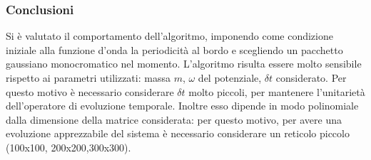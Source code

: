 \subsubsection{Conclusioni}
Si è valutato il comportamento dell'algoritmo, imponendo come condizione iniziale alla funzione d'onda la periodicità al bordo e scegliendo
un pacchetto gaussiano monocromatico nel momento. L'algoritmo risulta essere molto sensibile rispetto ai parametri utilizzati: massa $m$, $\omega$ del potenziale,
$\delta t$ considerato. Per questo motivo è necessario considerare $ \delta t$ molto piccoli, per mantenere l'unitarietà dell'operatore di evoluzione temporale.
Inoltre esso dipende in modo polinomiale dalla dimensione della matrice considerata: per questo motivo, per avere una evoluzione apprezzabile del sistema
è necessario considerare un reticolo piccolo (100x100, 200x200,300x300).\\


